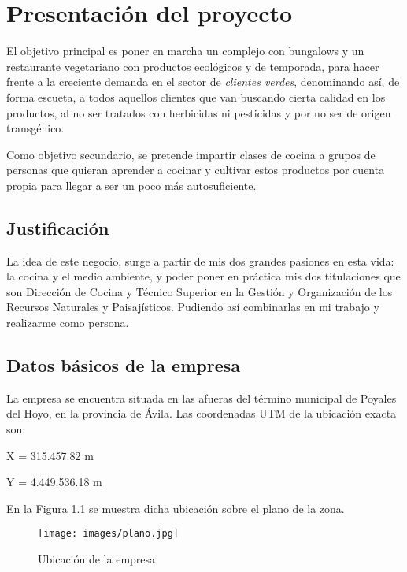 \chapter{Presentación del proyecto}
\label{chap:presentacion}

El objetivo principal es poner en marcha un complejo con bungalows y un restaurante vegetariano con productos ecológicos y de temporada, para hacer frente a la creciente demanda en el sector de \emph{clientes verdes}, denominando así, de forma escueta, a todos aquellos clientes que van  buscando cierta calidad en los productos, al no ser tratados con herbicidas ni pesticidas y por no ser de origen transgénico.

Como objetivo secundario, se pretende impartir clases de cocina a grupos de personas que quieran aprender a cocinar y cultivar estos productos por cuenta propia para llegar a ser un poco más autosuficiente.

\section{Justificación}
\label{sec:justificacion}
La idea de este negocio, surge a partir de mis dos grandes pasiones en esta vida: la cocina y el medio ambiente, y poder poner en práctica mis dos titulaciones que son Dirección de Cocina y Técnico Superior en la Gestión y Organización de los Recursos Naturales y Paisajísticos. Pudiendo así combinarlas en mi trabajo y realizarme como persona.

\section{Datos básicos de la empresa}
\label{sec:datos}

La empresa se encuentra situada en las afueras del término municipal de Poyales del Hoyo, en la provincia de Ávila.
Las coordenadas UTM de la ubicación exacta son:

X = 315.457.82 m

Y = 4.449.536.18 m

En la Figura \ref{fig:plano} se muestra dicha ubicación sobre el plano de la zona.

\begin{figure}[h]
  \begin{center}
    \texttt{[image: images/plano.jpg]}
    \caption{Ubicación de la empresa}
    \label{fig:plano}
  \end{center}
\end{figure}

